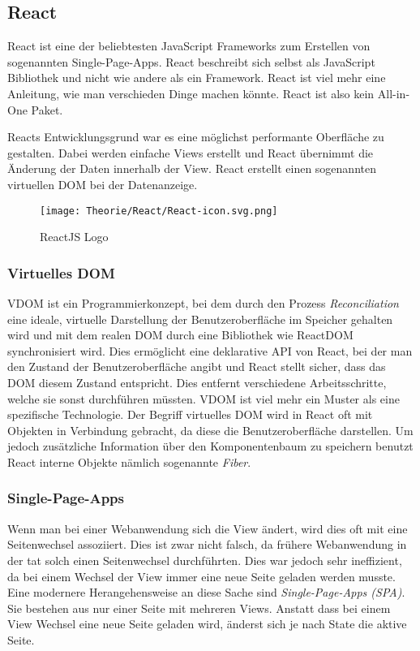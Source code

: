 \subsection{React}
\label{reactjs}
React ist eine der beliebtesten JavaScript Frameworks zum Erstellen von sogenannten Single-Page-Apps. React beschreibt sich selbst als 
JavaScript Bibliothek und nicht wie andere als ein Framework. React ist viel mehr eine Anleitung, wie man verschieden Dinge machen könnte.
React ist also kein All-in-One Paket.


Reacts Entwicklungsgrund war es eine möglichst performante Oberfläche zu gestalten. Dabei werden einfache Views erstellt und React
übernimmt die Änderung der Daten innerhalb der View. React erstellt einen sogenannten virtuellen DOM bei der Datenanzeige.


\begin{figure}[H]
  \begin{center}
    \texttt{[image: Theorie/React/React-icon.svg.png]}
    \caption{ReactJS Logo~\cite{reactjs}}
  \end{center}
\end{figure}

\subsubsection{Virtuelles DOM}
VDOM ist ein Programmierkonzept, bei dem durch den Prozess \textit{Reconciliation} eine ideale, virtuelle Darstellung der Benutzeroberfläche
im Speicher gehalten wird und mit dem realen DOM durch eine Bibliothek wie ReactDOM synchronisiert wird. Dies ermöglicht eine deklarative
API von React, bei der man den Zustand der Benutzeroberfläche angibt und React stellt sicher, dass das DOM diesem Zustand entspricht. Dies 
entfernt verschiedene Arbeitsschritte, welche sie sonst durchführen müssten.
VDOM ist viel mehr ein Muster als eine spezifische Technologie. Der Begriff virtuelles DOM wird in React oft mit Objekten in Verbindung gebracht,
da diese die Benutzeroberfläche darstellen. Um jedoch zusätzliche Information über den Komponentenbaum zu speichern benutzt React interne 
Objekte nämlich sogenannte \textit{Fiber}. 
\cite{DOM}

\subsubsection{Single-Page-Apps}
Wenn man bei einer Webanwendung sich die View ändert, wird dies oft mit eine Seitenwechsel assoziiert. Dies ist zwar nicht falsch, da 
frühere Webanwendung in der tat solch einen Seitenwechsel durchführten. Dies war jedoch sehr ineffizient, da bei einem Wechsel der View 
immer eine neue Seite geladen werden musste. Eine modernere Herangehensweise an diese Sache sind \textit{Single-Page-Apps (SPA)}.
Sie bestehen aus nur einer Seite mit mehreren Views. Anstatt dass bei einem View Wechsel eine neue Seite geladen wird, änderst sich je nach
State die aktive Seite. \cite{SPA}


